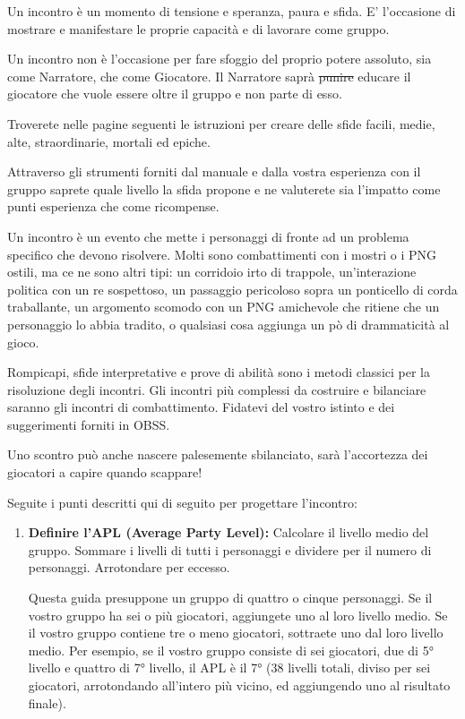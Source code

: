 \documentclass[a4paper,twoside,openany]{book}
\begin{document}
\begin{multicols}{2}

Un incontro è un momento di tensione e speranza, paura e sfida. E' l'occasione di mostrare e manifestare le proprie capacità e di lavorare come gruppo.

Un incontro non è l'occasione per fare sfoggio del proprio potere assoluto, sia come Narratore, che come Giocatore. Il Narratore saprà \st{punire} educare il giocatore che vuole essere oltre il gruppo e non parte di esso.

Troverete nelle pagine seguenti le istruzioni per creare delle sfide facili, medie, alte, straordinarie, mortali ed epiche.

Attraverso gli strumenti forniti dal manuale e dalla vostra esperienza con il gruppo saprete quale livello la sfida propone e ne valuterete sia l'impatto come punti esperienza che come ricompense.

Un incontro è un evento che mette i personaggi di fronte ad un problema specifico che devono risolvere. Molti sono combattimenti con i mostri o i PNG ostili, ma ce ne sono altri tipi: un corridoio irto di trappole, un'interazione politica con un re sospettoso, un passaggio pericoloso sopra un ponticello di corda traballante, un argomento scomodo con un PNG amichevole che ritiene che un personaggio lo abbia tradito, o qualsiasi cosa aggiunga un pò di drammaticità al gioco.

Rompicapi, sfide interpretative e prove di abilità sono i metodi classici per la risoluzione degli incontri. Gli incontri più complessi da costruire e bilanciare saranno gli incontri di combattimento. Fidatevi del vostro istinto e dei suggerimenti forniti in OBSS.

Uno scontro può anche nascere palesemente sbilanciato, sarà l'accortezza dei giocatori a capire quando scappare!

Seguite i punti descritti qui di seguito per progettare l'incontro:

\begin{enumerate}[leftmargin=*] \setlength{\itemsep}{0pt}
	\item \textbf{Definire l'APL (Average Party Level):} Calcolare il livello medio del gruppo. Sommare i livelli di tutti i personaggi e dividere per il numero di personaggi. Arrotondare per eccesso.
	
	Questa guida presuppone un gruppo di quattro o cinque personaggi. Se il vostro gruppo ha sei o più giocatori, aggiungete uno al loro livello medio. Se il vostro gruppo contiene tre o meno giocatori, sottraete uno dal loro livello medio. Per esempio, se il vostro gruppo consiste di sei giocatori, due di 5° livello e quattro di 7° livello, il APL è il 7° (38 livelli totali, diviso per sei giocatori, arrotondando all'intero più vicino, ed aggiungendo uno al risultato finale).
	

\end{enumerate}
\end{multicols}
\end{document}
